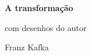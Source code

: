 




\begingroup\thispagestyle{empty}\vspace*{.05\textheight} 

              

              \formular
              \Huge
              \noindent
              \textbf{A transformação}
              \vspace{-0.35em}

              {\braboitalic\Large
              \noindent{}com desenhos do autor}
              \medskip  
              
              {\brabo\LARGE
              \noindent Franz Kafka}

\endgroup
\vfill
\pagebreak